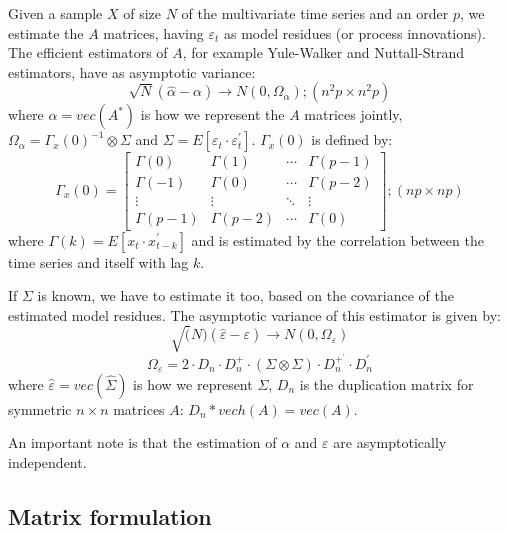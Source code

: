 \documentclass[a4paper,10pt]{article}
\begin{document}
Given a sample $X$ of size $N$ of the multivariate time series and an order $p$, we estimate the $A$ matrices, having $\varepsilon_{t}$ as model residues (or process innovations). The efficient estimators of $A$, for example Yule-Walker and Nuttall-Strand estimators, have as asymptotic variance:
\begin{equation}
\sqrt{N} (\hat{\alpha} - \alpha) \to N(0,\Omega_{\alpha}); (n^{2}p \times n^{2}p)
\end{equation}
where $\alpha = vec(A^{\ast})$ is how we represent the $A$ matrices jointly, $\Omega_{\alpha} = \Gamma_{x}(0)^{-1}\otimes \Sigma$ and $\Sigma = E[\varepsilon_{t}\cdot \varepsilon_{t}^{'}]$. $\Gamma_{x}(0)$ is defined by:
\begin{equation}
\Gamma_{x}(0) = \left[ \begin{array}{cccc} 
\Gamma(0) & \Gamma(1) & \cdots & \Gamma(p-1) \\
\Gamma(-1) & \Gamma(0) & \cdots & \Gamma(p-2) \\
\vdots & \vdots & \ddots & \vdots \\
\Gamma(p-1) & \Gamma(p-2) & \cdots & \Gamma(0) \end{array} \right]; (np \times np)
\end{equation}
where $\Gamma(k) = E[x_{t} \cdot x_{t-k}^{'}]$ and is estimated by the correlation between the time series and itself with lag $k$.

If $\Sigma$ is known, we have to estimate it too, based on the covariance of the estimated model residues. The asymptotic variance of this estimator is given by:
\begin{equation} 
\sqrt(N) (\hat{\varepsilon} - \varepsilon) \to N(0, \Omega_{\varepsilon})
\end{equation}
\begin{equation}
\Omega_{\varepsilon} = 2 \cdot D_{n} \cdot D_{n}^{+} \cdot (\Sigma \otimes \Sigma) \cdot D_{n}^{+^{'}} \cdot D_{n}^{'}
\end{equation}
where $\hat{\varepsilon} = vec(\hat{\Sigma})$ is how we represent $\Sigma$, $D_{n}$ is the duplication matrix for symmetric $ n \times n$ matrices $A$: $D_{n}*vech(A) = vec(A)$.

An important note is that the estimation of $\alpha$ and $\varepsilon$ are asymptotically independent.

\subsection{Matrix formulation}
\end{document}
